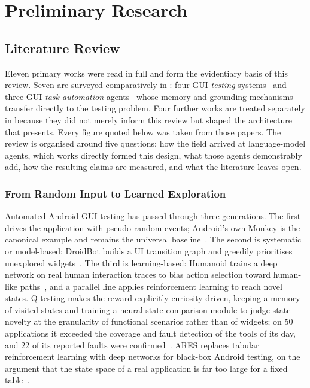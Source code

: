 \chapter{Preliminary Research}
\label{ch:research}

\section{Literature Review}
\label{sec:literature}

Eleven primary works were read in full and form the evidentiary basis of this
review. Seven are surveyed comparatively in : four GUI
\emph{testing} systems~\cite{gptdroid,droidagent,auitestagent,xuatcopilot} and
three GUI \emph{task-automation} agents~\cite{autodroid,appagent,appagentx}
whose memory and grounding mechanisms transfer directly to the testing problem.
Four further works are treated separately in  because
they did not merely inform this review but shaped the architecture that
 presents. Every figure quoted below was taken from those
papers. The review is organised around five questions: how the field arrived at
language-model agents, which works directly formed this design, what those
agents demonstrably add, how the resulting claims are measured, and what the
literature leaves open.

\subsection{From Random Input to Learned Exploration}
\label{subsec:lineage}

Automated Android GUI testing has passed through three generations. The first
drives the application with pseudo-random events; Android's own Monkey is the
canonical example and remains the universal baseline~\cite{monkey}. The second
is systematic or model-based: DroidBot builds a UI transition graph and
greedily prioritises unexplored widgets~\cite{droidbot}. The third is
learning-based: Humanoid trains a deep network on real human interaction traces
to bias action selection toward human-like paths~\cite{humanoid}, and a
parallel line applies reinforcement learning to reach novel states. Q-testing
makes the reward explicitly curiosity-driven, keeping a memory of visited
states and training a neural state-comparison module to judge state novelty at
the granularity of functional scenarios rather than of widgets; on 50
applications it exceeded the coverage and fault detection of the tools of its
day, and 22 of its reported faults were confirmed~\cite{qtesting}. ARES
replaces tabular reinforcement learning with deep networks for black-box
Android testing, on the argument that the state space of a real application is
far too large for a fixed table~\cite{ares}.

